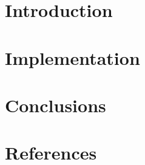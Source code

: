 \section[Intro]{Introduction}



\section[Impl]{Implementation}


\section[Concl]{Conclusions}


\section[Refs]{References}
